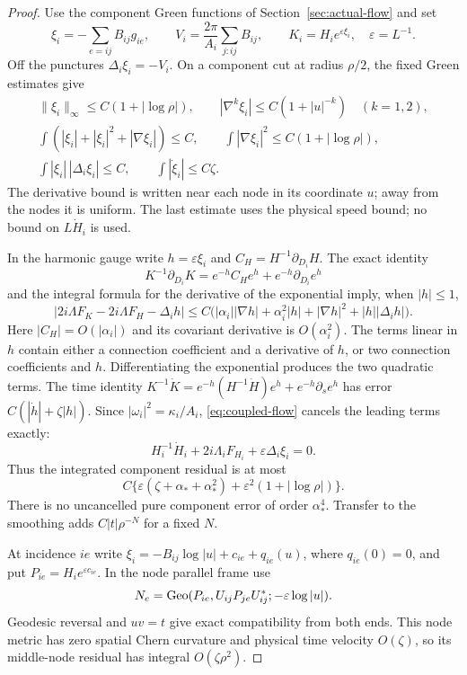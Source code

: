 \begin{proof}
Use the component Green functions of
Section~\ref{sec:actual-flow} and set
\[
 \xi_i=-\sum_{e=ij}B_{ij}g_{ie},\qquad
 V_i=\frac{2\pi}{A_i}\sum_{j:ij}B_{ij},
 \qquad K_i=H_i e^{\varepsilon\xi_i},
 \quad \varepsilon=L^{-1}.
\]
Off the punctures $\Delta_i\xi_i=-V_i$.
On a component cut at radius $\rho/2$,
the fixed Green estimates give
\[
 \begin{gathered}
 \|\xi_i\|_\infty\le C(1+|\log\rho|),\qquad
 |\nabla^k\xi_i|\le C(1+|u|^{-k})\quad(k=1,2),\\
 \int(|\xi_i|+|\xi_i|^2+|\nabla\xi_i|)\le C,\qquad
 \int|\nabla\xi_i|^2\le C(1+|\log\rho|),\\
 \int|\xi_i|\,|\Delta_i\xi_i|\le C,\qquad
 \int|\dot\xi_i|\le C\zeta .
 \end{gathered}
\]
The derivative bound is written near each
node in its coordinate $u$; away from the
nodes it is uniform. The last estimate uses the physical speed
bound; no bound on $L\dot H_i$ is used.

In the harmonic gauge write $h=\varepsilon\xi_i$
and $C_H=H^{-1}\partial_{D_i}H$.
The exact identity
\[
 K^{-1}\partial_{D_i}K
       =e^{-h}C_He^h+e^{-h}\partial_{D_i}e^h
\]
and the integral formula for the derivative
of the exponential imply, when $|h|\le1$,
\[
 |2i\Lambda F_K-2i\Lambda F_H-\Delta_i h|
 \le C\bigl(
 |\alpha_i||\nabla h|+\alpha_i^2|h|
                +|\nabla h|^2+|h||\Delta_i h|\bigr).
\]
Here $|C_H|=O(|\alpha_i|)$ and its covariant
derivative is $O(\alpha_i^2)$.
The terms linear in $h$ contain either a
connection coefficient and a derivative of
$h$, or two connection coefficients and
$h$. Differentiating the exponential produces
the two quadratic terms. The time identity
$K^{-1}\dot K=e^{-h}(H^{-1}\dot H)e^h+
e^{-h}\partial_s e^h$ has error
$C(|\dot h|+\zeta|h|)$.
Since $|\omega_i|^2=\kappa_i/A_i$,
\eqref{eq:coupled-flow} cancels the leading
terms exactly:
\[
 H_i^{-1}\dot H_i+2i\Lambda_i F_{H_i}
                                +\varepsilon\Delta_i\xi_i=0.
\]
Thus the integrated component residual is
at most
\[
 C\{\varepsilon(\zeta+\alpha_*+\alpha_*^2)
                       +\varepsilon^2(1+|\log\rho|)\}.
\]
There is no uncancelled pure component
error of order $\alpha_*^4$.
Transfer to the smoothing adds
$C|t|\rho^{-N}$ for a fixed $N$.

At incidence $ie$ write
$\xi_i=-B_{ij}\log|u|+c_{ie}+q_{ie}(u)$,
where $q_{ie}(0)=0$, and put
$P_{ie}=H_i e^{\varepsilon c_{ie}}$.
In the node parallel frame use
\[
 N_e=\operatorname{Geo}(P_{ie},U_{ij}P_{je}U_{ij}^*;
                                          -\varepsilon\log|u|).
\]
Geodesic reversal and $uv=t$ give exact
compatibility from both ends.
This node metric has zero spatial Chern
curvature and physical time velocity
$O(\zeta)$, so its middle-node residual
has integral $O(\zeta\rho^2)$.


\end{proof}
